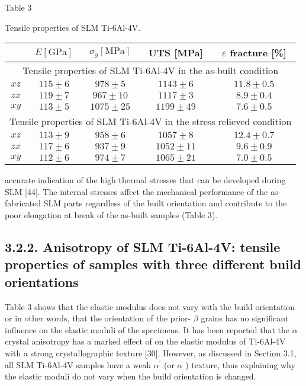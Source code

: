 \documentclass[10pt]{article}
\begin{document}
Table 3

Tensile properties of SLM Ti-6Al-4V.

\begin{center}
\begin{tabular}{|c|c|c|c|c|}
\hline
 & $E[\mathrm{GPa}]$ & $\sigma_{y}[\mathrm{MPa}]$ & UTS [MPa] & $\varepsilon$ fracture [\%] \\
\hline
\multicolumn{5}{|c|}{Tensile properties of SLM Ti-6Al-4V in the as-built condition} \\
\hline
$x z$ & $115 \pm 6$ & $978 \pm 5$ & $1143 \pm 6$ & $11.8 \pm 0.5$ \\
\hline
$z x$ & $119 \pm 7$ & $967 \pm 10$ & $1117 \pm 3$ & $8.9 \pm 0.4$ \\
\hline
$x y$ & $113 \pm 5$ & $1075 \pm 25$ & $1199 \pm 49$ & $7.6 \pm 0.5$ \\
\hline
\multicolumn{5}{|c|}{Tensile properties of SLM Ti-6Al-4V in the stress relieved condition} \\
\hline
$x z$ & $113 \pm 9$ & $958 \pm 6$ & $1057 \pm 8$ & $12.4 \pm 0.7$ \\
\hline
$z x$ & $117 \pm 6$ & $937 \pm 9$ & $1052 \pm 11$ & $9.6 \pm 0.9$ \\
\hline
$x y$ & $112 \pm 6$ & $974 \pm 7$ & $1065 \pm 21$ & $7.0 \pm 0.5$ \\
\hline
\end{tabular}
\end{center}

accurate indication of the high thermal stresses that can be developed during SLM [44]. The internal stresses affect the mechanical performance of the as-fabricated SLM parts regardless of the built orientation and contribute to the poor elongation at break of the as-built samples (Table 3).

\subsection*{3.2.2. Anisotropy of SLM Ti-6Al-4V: tensile properties of samples with three different build orientations}
Table 3 shows that the elastic modulus does not vary with the build orientation or in other words, that the orientation of the prior- $\beta$ grains has no significant influence on the elastic moduli of the specimens. It has been reported that the $\alpha$ crystal anisotropy has a marked effect of on the elastic modulus of Ti-6Al-4V with a strong crystallographic texture [30]. However, as discussed in Section 3.1, all SLM Ti-6Al-4V samples have a weak $\alpha^{\prime}$ (or $\alpha$ ) texture, thus explaining why the elastic moduli do not vary when the build orientation is changed.
\end{document}

